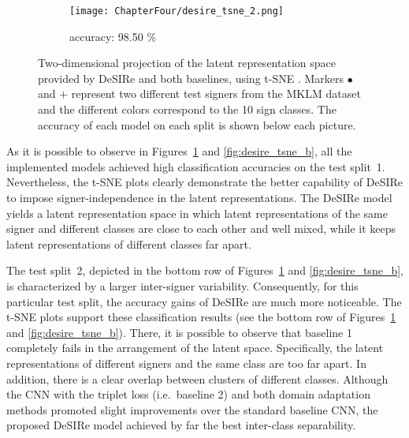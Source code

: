 \begin{figure}[ht!]
\begin{minipage}[t!]{0.985\textwidth}
\begin{subfigure}{0.325\textwidth}
            \centering
            \texttt{[image: ChapterFour/desire\_tsne\_2.png]}
            \caption{accuracy: 98.50 \%}
        \end{subfigure}
    \end{minipage}
    \caption{Two-dimensional projection of the latent representation space provided by DeSIRe and both baselines, using t-SNE \cite{Maaten2008}. Markers $\bullet$ and $\textbf{+}$ represent two different test signers from the MKLM dataset and the different colors correspond to the 10 sign classes. The accuracy of each model on each split is shown below each picture.}
    \label{fig:desire_tsne_a}
\end{figure}

As it is possible to observe in Figures~\ref{fig:desire_tsne_a} and \ref{fig:desire_tsne_b}, all the implemented models achieved high classification accuracies on the test split~1. Nevertheless, the t-SNE plots clearly demonstrate the better capability of DeSIRe to impose signer-independence in the latent representations. The DeSIRe model yields a latent representation space in which latent representations of the same signer and different classes are close to each other and well mixed, while it keeps latent representations of different classes far apart.

The test split~2, depicted in the bottom row of Figures~\ref{fig:desire_tsne_a} and \ref{fig:desire_tsne_b}, is characterized by a larger inter-signer variability. Consequently, for this particular test split, the accuracy gains of DeSIRe are much more noticeable. The t-SNE plots support these classification results (see the bottom row of Figures~\ref{fig:desire_tsne_a} and \ref{fig:desire_tsne_b}). There, it is possible to observe that baseline 1 completely fails in the arrangement of the latent space. Specifically, the latent representations of different signers and the same class are too far apart. In addition, there is a clear overlap between clusters of different classes. Although the CNN with the triplet loss (i.e.\ baseline 2) and both domain adaptation methods promoted slight improvements over the standard baseline CNN, the proposed DeSIRe model achieved by far the best inter-class separability.

